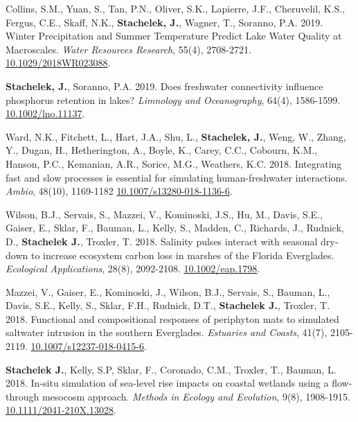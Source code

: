 \documentclass[11pt]{article}
\makeatletter
\newlength{\bibhang}
\newlength{\bibsep}
 {\@listi \global\bibsep\itemsep \global\advance\bibsep by\parsep}
\newenvironment{bibenum*}
  {\renewcommand\labelenumi{[\theenumi]}%
   \etaremune[
     topsep=0pt,
     itemsep=\bibsep,
     parsep=0pt,partopsep=0pt,
     itemindent=-\bibhang,
     leftmargin={\bibhang+\widthof{[999]}}]}
  {\endetaremune}
\makeatother
\begin{document}
\begin{bibenum*}
\item Collins, S.M., Yuan, S., Tan, P.N., Oliver, S.K., Lapierre, J.F., Cheruvelil, K.S., Fergus, C.E., Skaff, N.K., \textbf{Stachelek, J.}, Wagner, T., Soranno, P.A. 2019. Winter Precipitation and Summer Temperature Predict Lake Water Quality at Macroscales. \emph{Water Resources Research}, 55(4), 2708-2721. \href{https://doi.org/10.1029/2018WR023088}{10.1029/2018WR023088}.

\item \textbf{Stachelek, J.}, Soranno, P.A. 2019. Does freshwater connectivity influence phosphorus retention in lakes? \emph{Limnology and Oceanography}, 64(4), 1586-1599. \href{https://doi.org/10.1002/lno.11137}{10.1002/lno.11137}.

\item Ward, N.K., Fitchett, L., Hart, J.A., Shu, L., \textbf{Stachelek, J.}, Weng, W., Zhang, Y., Dugan, H., Hetherington, A., Boyle, K., Carey, C.C., Cobourn, K.M., Hanson, P.C., Kemanian, A.R., Sorice, M.G., Weathers, K.C. 2018. Integrating fast and slow processes is essential for simulating human-freshwater interactions. \emph{Ambio}, 48(10), 1169-1182 \href{https://doi.org/10.1007/s13280-018-1136-6}{10.1007/s13280-018-1136-6}.

  \item Wilson, B.J., Servais, S., Mazzei, V., Kominoski, J.S., Hu, M., Davis, S.E., Gaiser, E., Sklar, F., Bauman, L., Kelly, S., Madden, C., Richards, J., Rudnick, D., \textbf{Stachelek J.}, Troxler, T. 2018. Salinity pulses interact with seasonal dry‐down to increase ecosystem carbon loss in marshes of the Florida Everglades. \emph{Ecological Applications}, 28(8), 2092-2108. \href{https://doi.org/10.1002/eap.1798}{10.1002/eap.1798}.

  \item Mazzei, V., Gaiser, E., Kominoski, J., Wilson, B.J., Servais, S., Bauman, L., Davis, S.E., Kelly, S., Sklar, F.H., Rudnick, D.T., \textbf{Stachelek J.}, Troxler, T. 2018. Functional and compositional responses of periphyton mats to simulated saltwater intrusion in the southern Everglades. \emph{Estuaries and Coasts}, 41(7), 2105-2119. \href{https://doi.org/10.1007/s12237-018-0415-6}{10.1007/s12237-018-0415-6}.

  \item \textbf{Stachelek J.}, Kelly, S.P, Sklar, F., Coronado, C.M., Troxler, T., Bauman, L. 2018. In-situ simulation of sea-level rise impacts on coastal wetlands using a flow-through mesocosm approach. \emph{Methods in Ecology and Evolution}, 9(8), 1908-1915. \href{https://doi.org/10.1111/2041-210X.13028}{10.1111/2041-210X.13028}.


\end{bibenum*}
\end{document}
